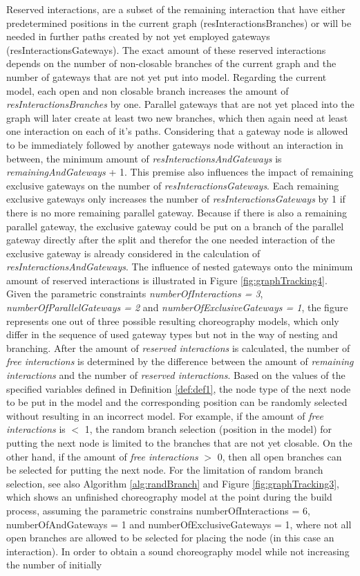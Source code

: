 Reserved interactions, are a subset of the remaining interaction that have either predetermined positions in the current graph (resInteractionsBranches) or will be needed in further paths created by not yet employed gateways (resInteractionsGateways). The exact amount of these reserved interactions depends on the number of non-closable branches of the current graph and the number of gateways that are not yet put into model. Regarding the current model, each open and non closable branch increases the amount of \textit{resInteractionsBranches} by one. Parallel gateways that are not yet placed into the graph will later create at least two new branches, which then again need at least one interaction on each of it's paths. Considering that a gateway node is allowed to be immediately followed by another gateways node without an interaction in between, the minimum amount of \textit{resInteractionsAndGateways} is \textit{remainingAndGateways} + 1. This premise also influences the impact of remaining exclusive gateways on the number of \textit{resInteractionsGateways}. Each remaining exclusive gateways only increases the number of \textit{resInteractionsGateways} by 1 if there is no more remaining parallel gateway. Because if there is also a remaining parallel gateway, the exclusive gateway could be put on a branch of the parallel gateway directly after the split and therefor the one needed interaction of the exclusive gateway is already considered in the calculation of \textit{resInteractionsAndGateways}. The influence of nested gateways onto the minimum amount of reserved interactions is illustrated in Figure \ref{fig:graphTracking4}. Given the parametric constraints \textit{numberOfInteractions = 3}, \textit{numberOfParallelGateways = 2} and \textit{numberOfExclusiveGateways = 1}, the figure represents one out of three possible resulting choreography models, which only differ in the sequence of used gateway types but not in the way of nesting and branching. After the amount of \textit{reserved interactions} is calculated, the number of \textit{free interactions} is determined by the difference between the amount of \textit{remaining interactions} and the number of \textit{reserved interactions}. Based on the values of the specified variables defined in Definition \ref{def:def1}, the node type of the next node to be put in the model and the corresponding position can be randomly selected without resulting in an incorrect model. For example, if the amount of \textit{free interactions} is $<$ 1, the random branch selection (position in the model) for putting the next node is limited to the branches that are not yet closable. On the other hand, if the amount of \textit{free interactions} $>$ 0, then all open branches can be selected for putting the next node. For the limitation of random branch selection, see also Algorithm \ref{alg:randBranch} and  Figure \ref{fig:graphTracking3}, which shows an unfinished choreography model at the point during the build process, assuming the parametric constrains numberOfInteractions = 6, numberOfAndGateways = 1 and numberOfExclusiveGateways = 1, where not all open branches are allowed to be selected for placing the node (in this case an interaction). In order to obtain a sound choreography model while not increasing the number of initially 
